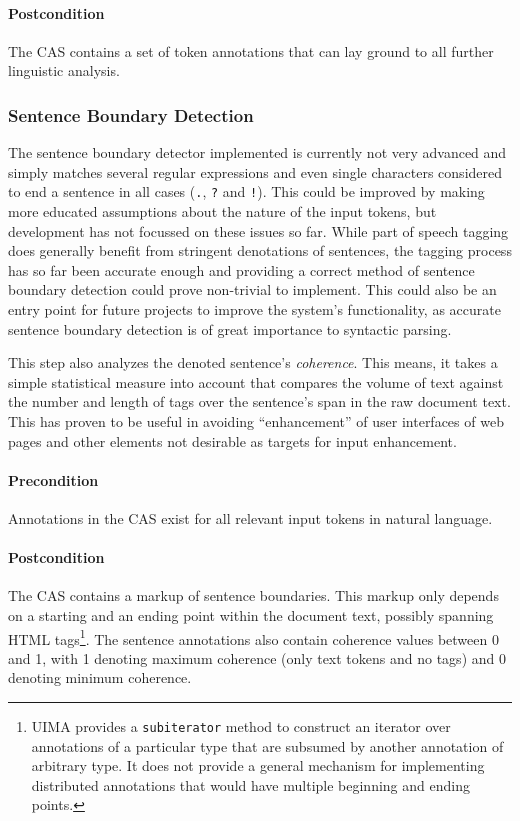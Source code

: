 \documentclass[12pt]{scrartcl}
\begin{document}
\paragraph{Postcondition} The CAS contains a set of token annotations that can lay 
ground to all further linguistic analysis.

\subsubsection{Sentence Boundary Detection}

The sentence boundary detector implemented is currently not very advanced and
simply matches several regular expressions and even single characters considered
to end a sentence in all cases (\verb#.#, \verb#?# and \verb#!#). This could be
improved by making more educated assumptions about the nature of the input
tokens, but development has not focussed on these issues so far. While part of speech
tagging does generally benefit from stringent denotations of sentences, the
tagging process has so far been accurate enough and 
providing a correct method of sentence boundary detection could prove
non-trivial to implement. This could also be an entry point for future projects
to improve the system's functionality, as accurate sentence boundary detection
is of great importance to syntactic parsing.

This step also analyzes the denoted sentence's \emph{coherence}. This means, it
takes a simple statistical measure into account that compares the volume of text
against the number and length of tags over the sentence's span in the raw
document text. This has proven to be useful in avoiding ``enhancement'' of user
interfaces of web pages and other elements not desirable as targets for input
enhancement.

\paragraph{Precondition} Annotations in the CAS exist for all relevant input
tokens in natural language.
\paragraph{Postcondition} The CAS contains a markup of sentence boundaries. This
markup only depends on a starting and an ending point within the document text,
possibly spanning HTML tags\footnote{UIMA provides a \texttt{subiterator} method to
construct an iterator over annotations of a particular type that are subsumed by
another annotation of arbitrary type. It does not provide a general mechanism
for implementing distributed annotations that would have multiple beginning and
ending points.}. The sentence annotations also contain coherence values between
0 and 1, with 1 denoting maximum coherence (only text tokens and no tags) and 0
denoting minimum coherence.
\end{document}
